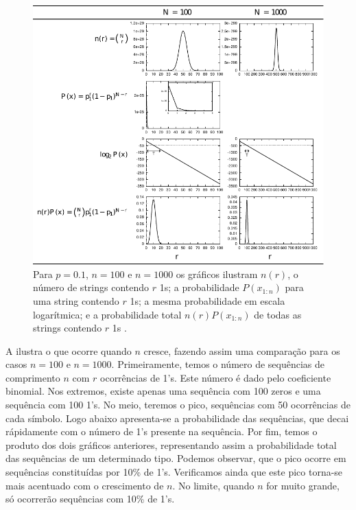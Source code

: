 \begin{figure}%
  \centering
  \includegraphics[width=\linewidth]{figures/seq100mackay2.pdf}
  \caption{Para $p=0.1$, $n=100$ e $n=1000$ os gráficos ilustram $n(r)$, o número de strings contendo 
    $r$ 1s; a probabilidade $P(x_{1:n})$ para uma string contendo $r$ 1s; a mesma probabilidade
    em escala logarítmica; e a probabilidade total $n(r) P(x_{1:n})$ de todas as strings contendo $r$ 1s \parencite{mackay2003}.
  }
  \label{fig:seq100mackay2}
\end{figure}

A  ilustra o que ocorre quando $n$ cresce, fazendo assim
uma comparação para os casos $n=100$ e $n=1000$. Primeiramente, temos o número
de sequências de comprimento $n$ com $r$ ocorrências de 1's. Este número é dado
pelo coeficiente binomial. Nos extremos, existe apenas uma sequência com 100 zeros 
e uma sequência com 100 1's. No meio, teremos o pico, sequências com 50 ocorrências
de cada símbolo. Logo abaixo apresenta-se a probabilidade das sequências, que decai
rápidamente com o número de 1's presente na sequência. Por fim, temos o produto
dos dois gráficos anteriores, representando assim a probabilidade total das sequências
de um determinado tipo. Podemos observar, que o pico ocorre em sequências constituídas por
10\% de 1's. Verificamos ainda que este pico torna-se mais acentuado com o crescimento de $n$.
No limite, quando $n$ for muito grande, só ocorrerão sequências com 10\% de 1's.




